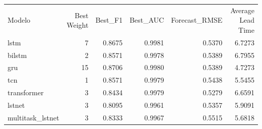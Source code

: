 \begin{tabular}{lrrrrr}
Modelo & Best Weight & Best_F1 & Best_AUC & Forecast_RMSE & Average Lead Time \\
lstm & 7 & 0.8675 & 0.9981 & 0.5370 & 6.7273 \\
bilstm & 2 & 0.8571 & 0.9978 & 0.5389 & 6.7955 \\
gru & 15 & 0.8706 & 0.9980 & 0.5389 & 4.7273 \\
tcn & 1 & 0.8571 & 0.9979 & 0.5438 & 5.5455 \\
transformer & 3 & 0.8434 & 0.9979 & 0.5279 & 6.6591 \\
lstnet & 3 & 0.8095 & 0.9961 & 0.5357 & 5.9091 \\
multitask_lstnet & 3 & 0.8333 & 0.9967 & 0.5515 & 5.6818 \\
\end{tabular}
